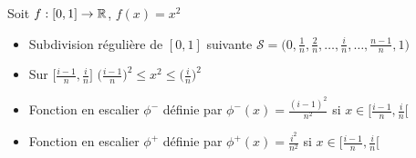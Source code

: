 \begin{frame}

\begin{exemple}

\begin{minipage}{0.49\textwidth}
Soit $f:[0,1] \to \mathbb{R}$, $f(x)=x^2$  


\end{minipage}
\hfill
\begin{minipage}{0.44\textwidth}
\end{minipage}



\pause
\pause 
\pause

\vspace*{-10mm}

\begin{itemize}
  \item Subdivision régulière de $[0,1]$ suivante 
$\mathcal{S}=\big(0,\frac1n,\frac2n,\ldots,\frac in,\ldots, \frac{n-1}{n},1\big)$
\pause

  \item Sur $\big[\frac{i-1}{n},\frac in\big]$ $\big(\tfrac{i-1}{n}\big)^2 \le x^2 \le \big(\tfrac in\big)^2$
\pause

  \item Fonction en escalier $\phi^-$ définie par $\phi^-(x) = \frac{(i-1)^2}{n^2}$ si $x \in \big[\frac{i-1}{n},\frac in\big[$
\pause

  \item Fonction en escalier $\phi^+$ définie par  $\phi^+(x) = \frac{i^2}{n^2}$ si $x \in \big[\frac{i-1}{n},\frac in\big[$
\end{itemize}
\end{exemple}

\end{frame}


